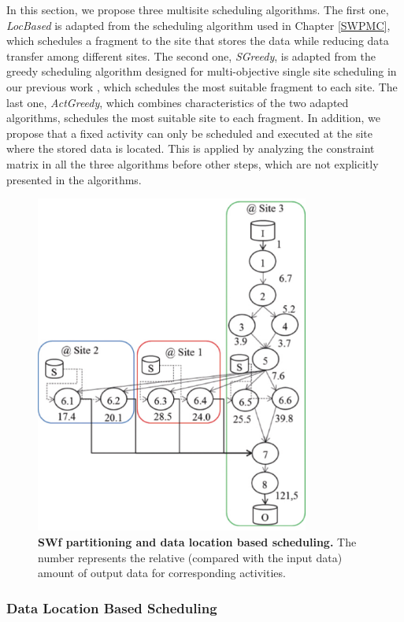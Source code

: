 In this section, we propose three multisite scheduling algorithms. The first one, \textit{LocBased} is adapted from the scheduling algorithm used in Chapter \ref{SWPMC}, which schedules a fragment to the site that stores the data while reducing data transfer among different sites. The second one, \textit{SGreedy}, is adapted from the greedy scheduling algorithm designed for multi-objective single site scheduling in our previous work \cite{Oliveira2012}, which schedules the most suitable fragment to each site. The last one, \textit{ActGreedy}, which combines characteristics of the two adapted algorithms, schedules the most suitable site to each fragment. In addition, we propose that a fixed activity can only be scheduled and executed at the site where the stored data is located. This is applied by analyzing the constraint matrix in all the three algorithms before other steps, which are not explicitly presented in the algorithms.
\begin{figure}[htbp]
\begin{centering}
\captionsetup{justification=centering}
\includegraphics[width=90mm]{figures/FIG3}
\par\end{centering}
\caption{\textbf{SWf partitioning and data location based scheduling.} The number represents the relative (compared with the input data) amount of output data for corresponding activities.}
\label{fig:LocBased}
\end{figure}

\subsubsection{Data Location Based Scheduling}


